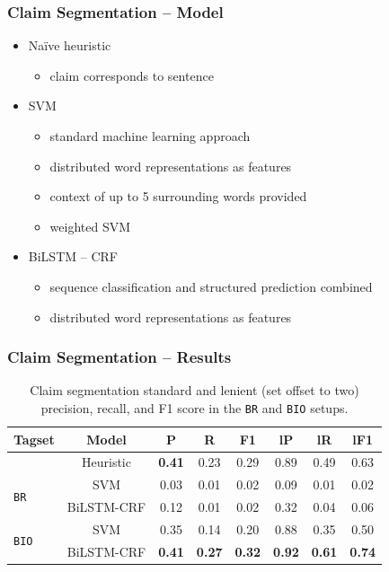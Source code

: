 \documentclass{beamer}
\begin{document}
\begin{frame}
	\frametitle{Claim Segmentation -- Model}

	\begin{itemize}
		\item Na\"ive heuristic
		\begin{itemize}
			\item claim corresponds to sentence
		\end{itemize}
		\item SVM
		\begin{itemize}
			\item standard machine learning approach
			\item distributed word representations as features
			\item context of up to 5 surrounding words provided 
			\item weighted SVM
		\end{itemize}
		\item BiLSTM -- CRF
		\begin{itemize}
			\item sequence classification and structured prediction combined
			\item distributed word representations as features
		\end{itemize}
	\end{itemize}
\end{frame}

\begin{frame}

\frametitle{Claim Segmentation -- Results}

\begin{table}
\setlength{\tabcolsep}{6pt} %
\renewcommand{\arraystretch}{1.2} %
	\begin{tabular}{l c  c c c c c c}
\toprule
		Tagset & Model & P & R & F1 & lP & lR & lF1 \\
      \midrule
		& Heuristic    & \textbf{0.41} & 0.23 & 0.29 & 0.89 & 0.49 & 0.63 \\
		\cline{2-8}
		\multirow{2}{*}{\texttt{BR} } & SVM & 0.03 & 0.01 & 0.02 & 0.09 & 0.01 & 0.02 \\
		                     & BiLSTM-CRF & 0.12 & 0.01 & 0.02 & 0.32 & 0.04 & 0.06 \\
		\cline{2-8}
		\multirow{2}{*}{\texttt{BIO}} & SVM & 0.35 & 0.14 & 0.20 & 0.88 & 0.35 & 0.50 \\
				     & BiLSTM-CRF & 
				     \textbf{0.41} & 
				     \textbf{0.27}  & \textbf{0.32} & \textbf{0.92} & \textbf{0.61} & \textbf{0.74} \\
      \bottomrule
	\end{tabular}
	\caption{Claim segmentation standard and lenient (set offset to two) precision, recall, 
	and F1 score in the \texttt{BR} and \texttt{BIO} setups. }
\end{table}
\end{frame}
\end{document}
